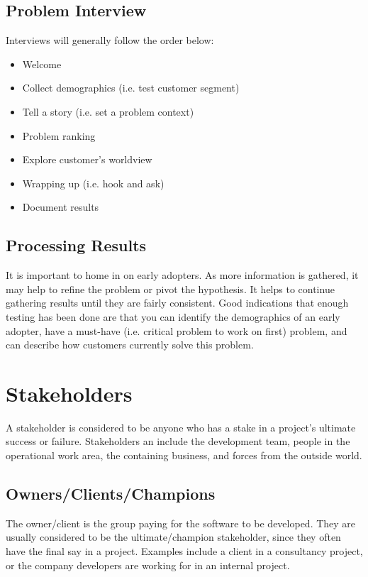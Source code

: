 \documentclass[12pt,titlepage]{article}
\begin{document}
    \subsection{Problem Interview}
      Interviews will generally follow the order below:
      \begin{itemize}
        \item Welcome
        \item Collect demographics (i.e. test customer segment)
        \item Tell a story (i.e. set a problem context)
        \item Problem ranking
        \item Explore customer's worldview
        \item Wrapping up (i.e. hook and ask)
        \item Document results
      \end{itemize}

    \subsection{Processing Results}
      It is important to home in on early adopters. As more information is gathered, it may help to refine the problem or pivot the hypothesis.
      It helps to continue gathering results until they are fairly consistent. Good indications that enough testing has been done are that
      you can identify the demographics of an early adopter, have a must-have (i.e. critical problem to work on first) problem, and can describe
      how customers currently solve this problem.

  \section{Stakeholders}
    A stakeholder is considered to be anyone who has a stake in a project's ultimate success or failure. Stakeholders an include the development
    team, people in the operational work area, the containing business, and forces from the outside world.

    \subsection{Owners/Clients/Champions}
      The owner/client is the group paying for the software to be developed. They are usually considered to be the ultimate/champion stakeholder,
      since they often have the final say in a project. Examples include a client in a consultancy project, or the company developers are working
      for in an internal project.
\end{document}
